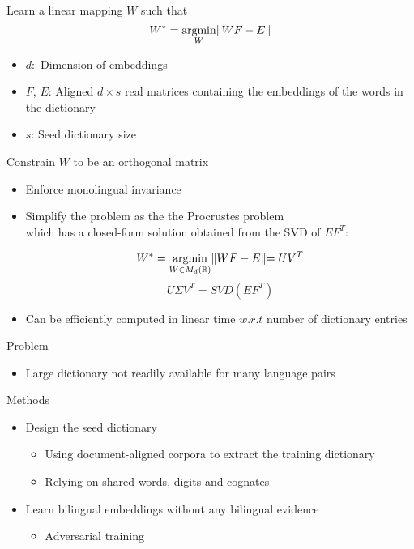\documentclass[11pt, a4paper, landscape]{article}
\newcommand*{\argmin}{\ensuremath{\operatornamewithlimits{argmin}}\xspace}
\begin{document}
	
	
	Learn a linear mapping ${W}$ such that
	\[W^*= \argmin\limits_{W} \lVert WF-E\rVert \]
	\begin{itemize}
		\item ${d:}$ Dimension of embeddings
		\item ${F}$, ${E}$: Aligned ${d \times s }$ real matrices containing the embeddings of the words in the dictionary
		\item ${s}$: Seed dictionary size
	\end{itemize}
	\vfill
	
	
	
	\NewPage
	\vfill
	Constrain ${W}$ to be an orthogonal matrix
	\begin{itemize}
		\item Enforce monolingual invariance
		
		\item Simplify the problem as the the Procrustes problem\\ which has a closed-form solution obtained from the SVD of  ${EF^T}$:
		
		
		
		\[ W^* = \argmin\limits_{W \in M_d( \mathbb{R})} \lVert WF-E\lVert  =  UV^T\]
		\[ U\varSigma V^T =  SVD(EF^T)\]
		
		\item Can be efficiently computed in linear time ${w.r.t}$ number of dictionary entries
	\end{itemize}
	\vfill
	\NewPage
	\vfill
	Problem
	\begin{itemize}
		\item Large dictionary not readily available for many language pairs\\
	\end{itemize}
	
	
	Methods
	\begin{itemize}
		\item Design the seed dictionary
		\begin{itemize}
			\item Using document-aligned corpora to extract the training dictionary
			\item Relying on shared words, digits and cognates
		\end{itemize}
		\item 	Learn bilingual embeddings without any bilingual evidence
		\begin{itemize}
			\item Adversarial training
			
		\end{itemize}
	\end{itemize}
	\vfill
	
\end{document}
